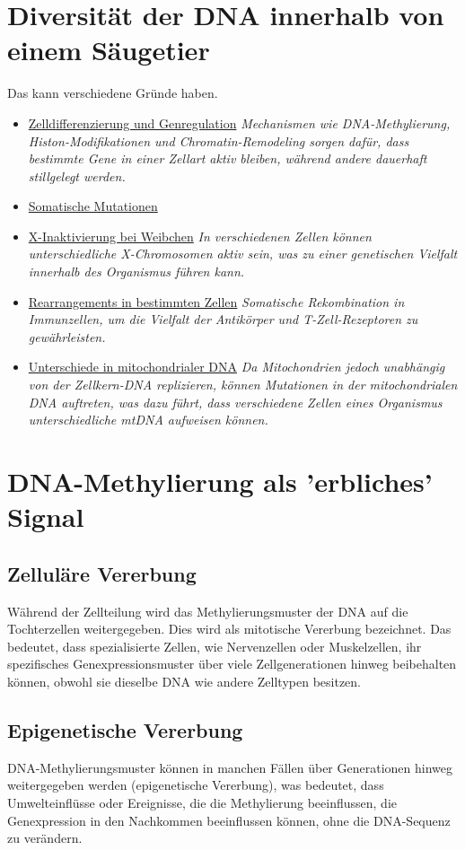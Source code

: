 \documentclass{article}
\begin{document}
\section{Diversität der DNA innerhalb von einem Säugetier}
Das kann verschiedene Gründe haben. 
\begin{itemize}
    \item \underline{Zelldifferenzierung und Genregulation} \newline
    \textit{Mechanismen wie DNA-Methylierung, Histon-Modifikationen und Chromatin-Remodeling sorgen dafür, dass bestimmte Gene in einer Zellart aktiv bleiben, während andere dauerhaft stillgelegt werden.}
    \item \underline{Somatische Mutationen }
    \item \underline{X-Inaktivierung bei Weibchen} \newline
    \textit{In verschiedenen Zellen können unterschiedliche X-Chromosomen aktiv sein, was zu einer genetischen Vielfalt innerhalb des Organismus führen kann.}
    \item \underline{Rearrangements in bestimmten Zellen} \newline
    \textit{Somatische Rekombination in Immunzellen, um die Vielfalt der Antikörper und T-Zell-Rezeptoren zu gewährleisten.}
    \item \underline{Unterschiede in mitochondrialer DNA} \newline
    \textit{Da Mitochondrien jedoch unabhängig von der Zellkern-DNA replizieren, können Mutationen in der mitochondrialen DNA auftreten, was dazu führt, dass verschiedene Zellen eines Organismus unterschiedliche mtDNA aufweisen können.}
\end{itemize}


\section{DNA-Methylierung als 'erbliches' Signal}
\subsection{Zelluläre Vererbung}
Während der Zellteilung wird das Methylierungsmuster der DNA auf die Tochterzellen weitergegeben. Dies wird als mitotische Vererbung bezeichnet. Das bedeutet, dass spezialisierte Zellen, wie Nervenzellen oder Muskelzellen, ihr spezifisches Genexpressionsmuster über viele Zellgenerationen hinweg beibehalten können, obwohl sie dieselbe DNA wie andere Zelltypen besitzen.
\subsection{Epigenetische Vererbung}
DNA-Methylierungsmuster können in manchen Fällen über Generationen hinweg weitergegeben werden (epigenetische Vererbung), was bedeutet, dass Umwelteinflüsse oder Ereignisse, die die Methylierung beeinflussen, die Genexpression in den Nachkommen beeinflussen können, ohne die DNA-Sequenz zu verändern.
\end{document}
